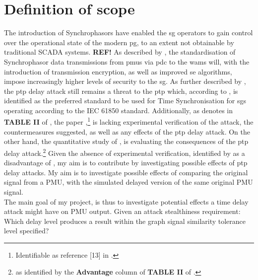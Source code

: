 \section{Definition of scope}
The introduction of Synchrophasors have enabled the \acrshort{sg} operators to gain control over the operational state of the modern \acrlong{pg}, to an extent not obtainable by traditional SCADA systems. \textbf{REF!} As described by  \cite{ullmann2009delay}, the standardisation of Synchrophasor data transmissions from \acrshort{pmu}s via \acrshort{pdc} to the \acrshort{wams} will, with the introduction of transmission encryption, as well as improved \acrlong{se} algorithms, impose increasingly higher levels of security to the \acrlong{sg}. 
As further described by \cite{ullmann2009delay}, the \acrshort{ptp} delay attack still remains a threat to the \acrlong{ptp} which, according to \cite{bishop2022iec}, is identified as the preferred standard to be used for Time Synchronisation  for \acrshort{sg}s operating according to the IEC 61850 standard.
Additionally, as \citeauthor{moussa2016security}denotes in \textbf{TABLE II} of \cite[p. 1959]{moussa2016security}, the paper \cite{ullmann2009delay},\footnote{Identifiable as reference [13] in \cite{moussa2016security}.} is lacking experimental verification of the attack, the countermeasures suggested, as well as any effects of the \acrshort{ptp} delay attack. 
On the other hand, the quantitative study of \cite{ullmann2009delay}, is evaluating the consequences of the \acrshort{ptp} delay attack.\footnote{ as identified by the \textbf{Advantage} column of \textbf{TABLE II} of \cite[p. 1959]{moussa2016security}. }
Given the absence of experimental verification, identified by \cite{moussa2016security} as a disadvantage of \cite{ullmann2009delay}, my aim is to contribute by investigating possible effects of \acrshort{ptp} delay attacks. My aim is to investigate possible effects of comparing the original signal from a PMU, with the simulated delayed version of the same original PMU signal. \\

The main goal of my project, is thus to investigate potential effects a time delay attack might have on PMU output. 
Given an attack stealthiness requirement: Which delay level produces a result within the graph signal similarity tolerance level specified?




